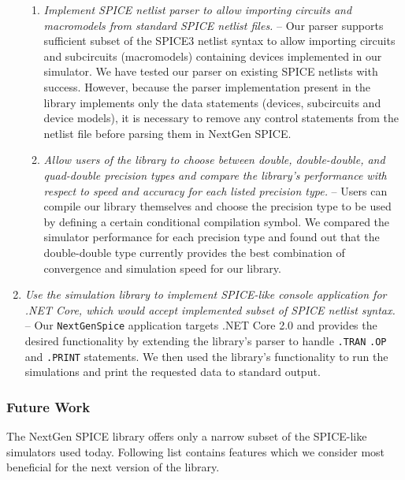 \begin{enumerate}
\begin{enumerate}
		\item \textit{Implement SPICE netlist parser to allow importing circuits and macromodels from standard SPICE netlist files.} -- Our parser supports sufficient subset of the SPICE3 netlist syntax to allow importing circuits and subcircuits (macromodels) containing devices implemented in our simulator. We have tested our parser on existing SPICE netlists with success. However, because the parser implementation present in the library implements only the data statements (devices, subcircuits and device models), it is necessary to remove any control statements from the netlist file before parsing them in NextGen SPICE.
		
		\item \textit{Allow users of the library to choose between double, double-double, and quad-double precision types and compare the library's performance with respect to speed and accuracy for each listed precision type.} -- Users can compile our library themselves and choose the precision type to be used by defining a certain conditional compilation symbol. We compared the simulator performance for each precision type and found out that the double-double type currently provides the best combination of convergence and simulation speed for our library.
	\end{enumerate}
	
	\item  \textit{Use the simulation library to implement SPICE-like console application for .NET Core, which would accept implemented subset of SPICE netlist syntax.} -- Our \texttt{NextGenSpice} application targets .NET Core 2.0 and provides the desired functionality by extending the library's parser to handle \texttt{.TRAN} \texttt{.OP} and \texttt{.PRINT} statements. We then used the library's functionality to run the simulations and print the requested data to standard output.
\end{enumerate}

\subsubsection{Future Work}
The NextGen SPICE library offers only a narrow subset of the SPICE-like simulators used today. Following list contains features which we consider most beneficial for the next version of the library.


